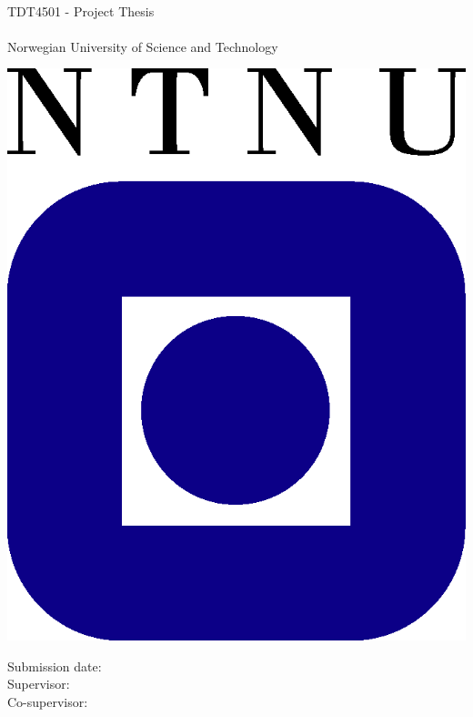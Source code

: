 \begin{titlepage}
\begin{center}

	{\Huge \thetitle} \\[0.4cm]


	{\Large TDT4501 - Project Thesis} \\[2.0cm]
	{\Large \theauthor} \\ [0.5cm]
	{\Large Norwegian University of Science and Technology}\\

	\vspace{3.0cm}

			\includegraphics{img/misc/ntnu-logo.png}

	\vspace{3.0cm}

	{\Large Submission date: \thedate} \\[0.2cm]
	{\Large Supervisor: \supervisor} \\ [0.2cm]
	{\Large Co-supervisor: \coSupervisor} \\ [0.2cm]
	
\end{center}
\end{titlepage}
